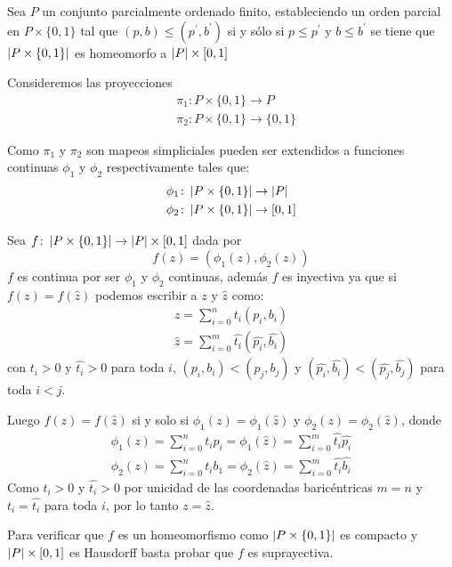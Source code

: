 \begin{Teo}
Sea $P$ un conjunto parcialmente ordenado finito, estableciendo un orden parcial en $P\times\{0,1\}$ tal que $(p,b)\leq (p^{'},b^{'})$ si y sólo si $p\leq p^{'}$ y $b\leq b^{'}$ se tiene que $\left| P\times\{0,1\} \right|$ es homeomorfo a $\left| P \right|\times[0,1]$
\end{Teo} 
\begin{Dem}

Consideremos las proyecciones
\begin{align*}
&\pi_1\colon P\times\{0,1\} \rightarrow P\\
&\pi_2\colon P\times\{0,1\} \rightarrow \{0,1\}
\end{align*}

Como $\pi_1$ y $\pi_2$ son mapeos simpliciales pueden ser extendidos a funciones continuas $\phi_1$ y $\phi_2$ respectivamente tales que:
\begin{align*}
&\phi_1\colon\left| P\times\{0,1\} \right| \rightarrow \left| P \right|\\
&\phi_2\colon\left| P\times\{0,1\} \right| \rightarrow [0,1]
\end{align*}

Sea $f\colon\left| P\times \{0,1\} \right| \rightarrow \left| P \right|\times [0,1]$ dada por 
\begin{equation*}
f(z)= (\phi_1(z),\phi_2(z))
\end{equation*}
$f$ es continua por ser $\phi_1$ y $\phi_2$ continuas, además $f$ es inyectiva ya que si $f(z)=f(\hat{z})$ podemos escribir a $z$ y $\hat{z}$ como:
\begin{eqnarray}
z = \sum_{i=0}^{n}t_i(p_i,b_i)\\
\hat{z} = \sum_{i=0}^{m}\hat{t_i}(\hat{p_i},\hat{b_i})
\end{eqnarray} 
con $t_i>0$ y $\hat{t_i}>0$ para toda $i$, $(p_i,b_i)<(p_j,b_j)$ y $(\hat{p_i},\hat{b_i})<(\hat{p_j},\hat{b_j})$ para toda $i<j$.

Luego $f(z) = f(\hat{z})$ si y solo si $\phi_1(z)=\phi_1(\hat{z})$ y $\phi_2(z)=\phi_2(\hat{z})$, donde 
\begin{eqnarray}
\phi_1(z) = \sum_{i=0}^{n}t_ip_i = \phi_1(\hat{z}) = \sum_{i=0}^{m}\hat{t_i}\hat{p_i}\\
\phi_2(z) = \sum_{i=0}^{n}t_ib_1 = \phi_2(\hat{z}) = \sum_{i=0}^{m}\hat{t_i}\hat{b_i}
\end{eqnarray}
Como $t_i>0$ y $\hat{t_i}>0$ por unicidad de las coordenadas baricéntricas $m=n$ y $t_i = \hat{t_i}$ para toda $i$, por lo tanto $z = \hat{z}$.

Para verificar que $f$ es un homeomorfismo como $\left| P\times\{0,1\} \right|$ es compacto y $\left| P \right|\times[0,1]$ es Hausdorff basta probar que $f$ es suprayectiva. 


\end{Dem}
